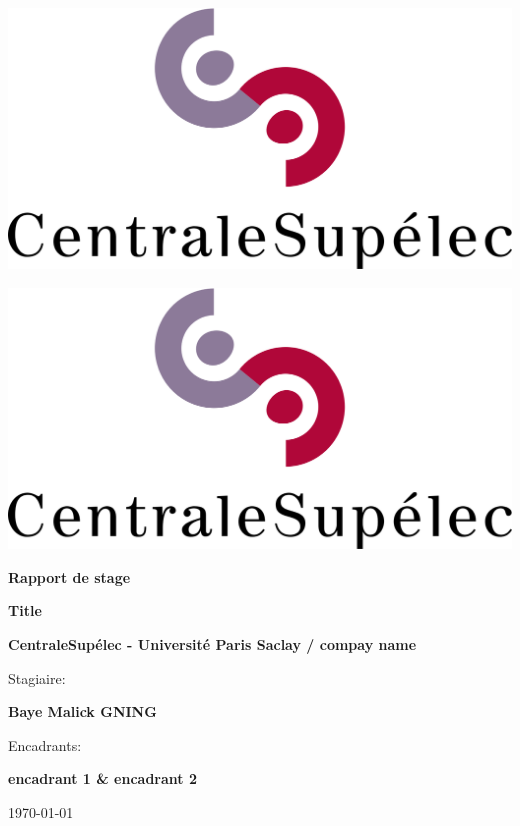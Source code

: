\documentclass[12pt,a4paper]{article}
\begin{document}
\begin{titlepage}
    \centering
    \noindent
    \begin{minipage}{0.5\textwidth} \includegraphics[width=0.5\linewidth]{logo-cs} %
    \end{minipage}\hfill
    \begin{minipage}{0.5\textwidth}
    \flushright
    \includegraphics[width=0.5\linewidth]{logo-cs}
    \end{minipage}
    
    \vspace{2cm}
    {\Huge\bfseries Rapport de stage\par}\vspace{2cm}
    
    \hrulefill
    
    {\Large\bfseries Title\par}
    \hrulefill
    
    \vspace{0.5cm}
    {\Large\bfseries CentraleSupélec - Université Paris Saclay / compay name\par}\vspace{0.5cm}
    {\Large Stagiaire: \par}\vspace{0.5cm}
    {\Large\bfseries Baye Malick GNING\par}\vspace{0.5cm}
    {\Large Encadrants: \par}\vspace{0.5cm}
    {\Large\bfseries encadrant 1 \& encadrant 2\par}\vspace{2cm}
    {\Large \today \par}

\end{titlepage}


\newpage
\tableofcontents














\newpage


\end{document}
